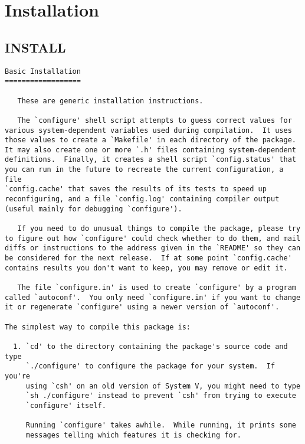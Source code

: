 \section{Installation}
\label{group__install}
\subsection{INSTALL}\label{group__install_install}


\footnotesize\begin{verbatim}Basic Installation
==================

   These are generic installation instructions.

   The `configure' shell script attempts to guess correct values for
various system-dependent variables used during compilation.  It uses
those values to create a `Makefile' in each directory of the package.
It may also create one or more `.h' files containing system-dependent
definitions.  Finally, it creates a shell script `config.status' that
you can run in the future to recreate the current configuration, a file
`config.cache' that saves the results of its tests to speed up
reconfiguring, and a file `config.log' containing compiler output
(useful mainly for debugging `configure').

   If you need to do unusual things to compile the package, please try
to figure out how `configure' could check whether to do them, and mail
diffs or instructions to the address given in the `README' so they can
be considered for the next release.  If at some point `config.cache'
contains results you don't want to keep, you may remove or edit it.

   The file `configure.in' is used to create `configure' by a program
called `autoconf'.  You only need `configure.in' if you want to change
it or regenerate `configure' using a newer version of `autoconf'.

The simplest way to compile this package is:

  1. `cd' to the directory containing the package's source code and type
     `./configure' to configure the package for your system.  If you're
     using `csh' on an old version of System V, you might need to type
     `sh ./configure' instead to prevent `csh' from trying to execute
     `configure' itself.

     Running `configure' takes awhile.  While running, it prints some
     messages telling which features it is checking for.


\end{verbatim}
